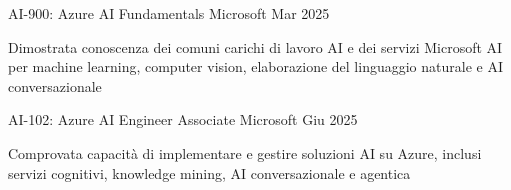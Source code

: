 \begin{cventries}
{AI-900: Azure AI Fundamentals} %
{Microsoft} %
{Mar 2025} %
{ %
\begin{cvitems}
  \item {Dimostrata conoscenza dei comuni carichi di lavoro AI e dei servizi Microsoft AI per machine learning, computer vision, elaborazione del linguaggio naturale e AI conversazionale}
\end{cvitems}
}

{AI-102: Azure AI Engineer Associate} %
{Microsoft} %
{Giu 2025} %
{ %
\begin{cvitems}
  \item {Comprovata capacità di implementare e gestire soluzioni AI su Azure, inclusi servizi cognitivi, knowledge mining, AI conversazionale e agentica}
\end{cvitems}
}
\fi

\end{cventries}
